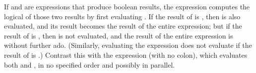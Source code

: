 If  and  are expressions that produce
boolean results, the expression  computes the
logical  of those two results by first evaluating .
If the result of  is , then  is also
evaluated, and its
result becomes the result of the entire expression; but if the result
of  is , then  is not evaluated,
and the result of the entire expression is  without further ado.
(Similarly, evaluating the expression  does not
evaluate  if the result of  is .)
Contrast this with the expression  (with no colon),
which evaluates both  and , in no specified order and
possibly in parallel.
